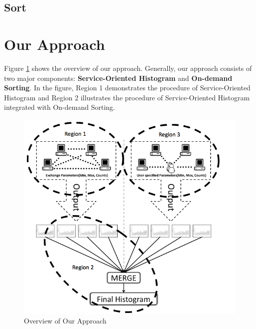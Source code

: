 \documentclass[times, 10pt,onecolumn]{article} %
\begin{document}
\subsection{Sort\cite{ps}}

\section{Our Approach}
Figure \ref{fig:overview} shows the overview of our approach. Generally, our approach consists of two major components: \textbf{Service-Oriented Histogram} and \textbf{On-demand Sorting}. In the figure, Region 1 demonstrates the procedure of Service-Oriented Histogram and Region 2 illustrates the procedure of Service-Oriented Histogram integrated with On-demand Sorting.

\begin{figure}[!iht]
\begin{center}
  \includegraphics[scale=0.65]{architecture.png}
  \caption{Overview of Our Approach}
  \label{fig:overview}
\end{center}
\end{figure}
\end{document}
